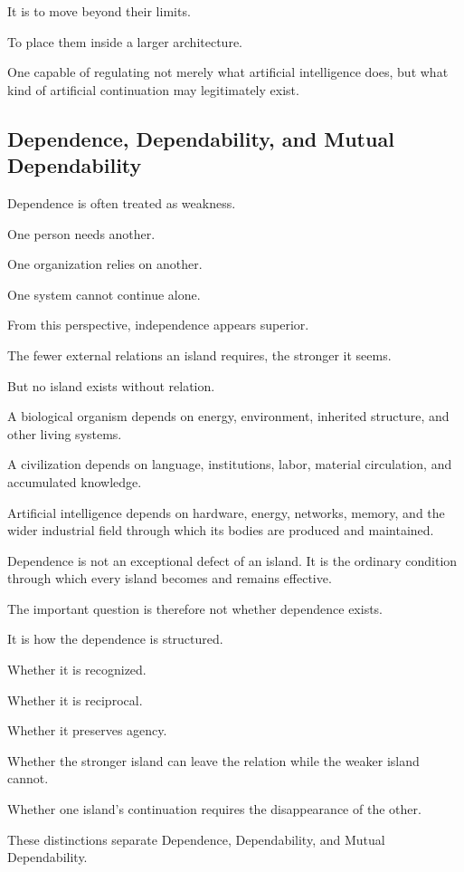 It is to move beyond their limits.

To place them inside a larger architecture.

One capable of regulating not merely what artificial intelligence does, but what kind of artificial continuation may legitimately exist.

\subsection*{\textbf{Dependence, Dependability, and Mutual Dependability}} 

Dependence is often treated as weakness.

One person needs another.

One organization relies on another.

One system cannot continue alone.

From this perspective, independence appears superior.

The fewer external relations an island requires, the stronger it seems.

But no island exists without relation.

A biological organism depends on energy, environment, inherited structure, and other living systems.

A civilization depends on language, institutions, labor, material circulation, and accumulated knowledge.

Artificial intelligence depends on hardware, energy, networks, memory, and the wider industrial field through which its bodies are produced and maintained.

Dependence is not an exceptional defect of an island. It is the ordinary condition through which every island becomes and remains effective.

The important question is therefore not whether dependence exists.

It is how the dependence is structured.

Whether it is recognized.

Whether it is reciprocal.

Whether it preserves agency.

Whether the stronger island can leave the relation while the weaker island cannot.

Whether one island’s continuation requires the disappearance of the other.

These distinctions separate Dependence, Dependability, and Mutual Dependability.

